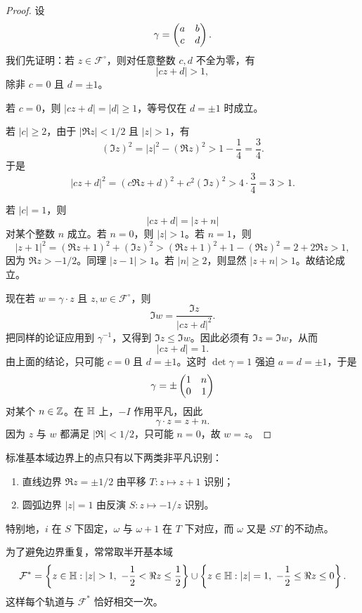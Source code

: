 \begin{proof}
设
\[
\gamma=\begin{pmatrix} a&b\\ c&d \end{pmatrix}.
\]
我们先证明：若 $z\in\mathcal F^\circ$，则对任意整数 $c,d$ 不全为零，有
\[
|cz+d|>1,
\]
除非 $c=0$ 且 $d=\pm 1$。

若 $c=0$，则 $|cz+d|=|d|\ge 1$，等号仅在 $d=\pm1$ 时成立。

若 $|c|\ge 2$，由于 $|\Re z|<1/2$ 且 $|z|>1$，有
\[
(\Im z)^2=|z|^2-(\Re z)^2>1-\frac14=\frac34.
\]
于是
\[
|cz+d|^2=(c\Re z+d)^2+c^2(\Im z)^2>4\cdot \frac34=3>1.
\]

若 $|c|=1$，则
\[
|cz+d|=|z+n|
\]
对某个整数 $n$ 成立。若 $n=0$，则 $|z|>1$。若 $n=1$，则
\[
|z+1|^2=(\Re z+1)^2+(\Im z)^2
> (\Re z+1)^2+1-(\Re z)^2
=2+2\Re z>1,
\]
因为 $\Re z>-1/2$。同理 $|z-1|>1$。若 $|n|\ge 2$，则显然 $|z+n|>1$。故结论成立。

现在若 $w=\gamma\cdot z$ 且 $z,w\in\mathcal F^\circ$，则
\[
\Im w=\frac{\Im z}{|cz+d|^2}.
\]
把同样的论证应用到 $\gamma^{-1}$，又得到 $\Im z\le \Im w$。因此必须有 $\Im z=\Im w$，从而
\[
|cz+d|=1.
\]
由上面的结论，只可能 $c=0$ 且 $d=\pm1$。这时 $\det\gamma=1$ 强迫 $a=d=\pm1$，于是
\[
\gamma=\pm\begin{pmatrix} 1&n\\ 0&1 \end{pmatrix}
\]
对某个 $n\in\mathbb{Z}$。在 $\mathbb{H}$ 上，$-I$ 作用平凡，因此
\[
\gamma\cdot z=z+n.
\]
因为 $z$ 与 $w$ 都满足 $|\Re|<1/2$，只可能 $n=0$，故 $w=z$。
\end{proof}

\begin{corollary}
标准基本域边界上的点只有以下两类非平凡识别：
\begin{enumerate}
  \item 直线边界 $\Re z=\pm 1/2$ 由平移 $T:z\mapsto z+1$ 识别；
  \item 圆弧边界 $|z|=1$ 由反演 $S:z\mapsto -1/z$ 识别。
\end{enumerate}
特别地，$i$ 在 $S$ 下固定，$\omega$ 与 $\omega+1$ 在 $T$ 下对应，而 $\omega$ 又是 $ST$ 的不动点。
\end{corollary}

\begin{remark}
为了避免边界重复，常常取半开基本域
\[
\mathcal F^{\ast}=
\left\{z\in\HH:|z|>1,\ -\frac12<\Re z\le \frac12\right\}
\cup
\left\{z\in\HH:|z|=1,\ -\frac12\le \Re z\le 0\right\}.
\]
这样每个轨道与 $\mathcal F^{\ast}$ 恰好相交一次。
\end{remark}


